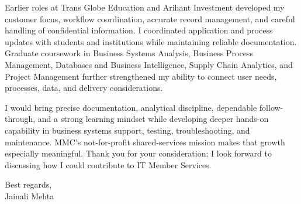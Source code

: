 \documentclass[letterpaper,11pt]{article}
\begin{document}
\bigbreak
Earlier roles at Trans Globe Education and Arihant Investment developed my customer focus, workflow coordination, accurate record management, and careful handling of confidential information. I coordinated application and process updates with students and institutions while maintaining reliable documentation. Graduate coursework in Business Systems Analysis, Business Process Management, Databases and Business Intelligence, Supply Chain Analytics, and Project Management further strengthened my ability to connect user needs, processes, data, and delivery considerations.

\bigbreak
I would bring precise documentation, analytical discipline, dependable follow-through, and a strong learning mindset while developing deeper hands-on capability in business systems support, testing, troubleshooting, and maintenance. MMC's not-for-profit shared-services mission makes that growth especially meaningful. Thank you for your consideration; I look forward to discussing how I could contribute to IT Member Services.

\bigbreak
Best regards,\\
Jainali Mehta
\end{document}
